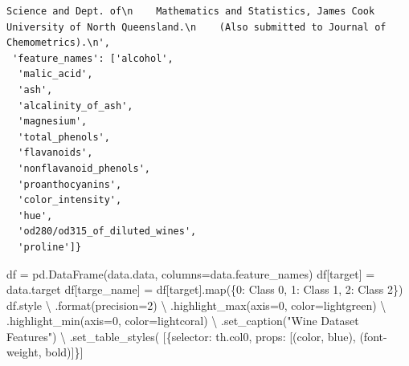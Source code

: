 \documentclass[
  letterpaper,
  DIV=11,
  numbers=noendperiod]{scrreprt}
\newenvironment{Shaded}{\begin{snugshade}}{\end{snugshade}}
\newcommand{\BuiltInTok}[1]{\textcolor[rgb]{0.00,0.23,0.31}{#1}}
\newcommand{\DecValTok}[1]{\textcolor[rgb]{0.68,0.00,0.00}{#1}}
\newcommand{\NormalTok}[1]{\textcolor[rgb]{0.00,0.23,0.31}{#1}}
\newcommand{\OperatorTok}[1]{\textcolor[rgb]{0.37,0.37,0.37}{#1}}
\newcommand{\StringTok}[1]{\textcolor[rgb]{0.13,0.47,0.30}{#1}}
\begin{document}
\begin{verbatim}
Science and Dept. of\n    Mathematics and Statistics, James Cook University of North Queensland.\n    (Also submitted to Journal of Chemometrics).\n',
 'feature_names': ['alcohol',
  'malic_acid',
  'ash',
  'alcalinity_of_ash',
  'magnesium',
  'total_phenols',
  'flavanoids',
  'nonflavanoid_phenols',
  'proanthocyanins',
  'color_intensity',
  'hue',
  'od280/od315_of_diluted_wines',
  'proline']}
\end{verbatim}

\begin{Shaded}
\begin{Highlighting}[]
\NormalTok{df }\OperatorTok{=}\NormalTok{ pd.DataFrame(data.data, columns}\OperatorTok{=}\NormalTok{data.feature\_names)}
\NormalTok{df[}\StringTok{\textquotesingle{}target\textquotesingle{}}\NormalTok{] }\OperatorTok{=}\NormalTok{ data.target}
\NormalTok{df[}\StringTok{\textquotesingle{}targe\_name\textquotesingle{}}\NormalTok{] }\OperatorTok{=}\NormalTok{ df[}\StringTok{\textquotesingle{}target\textquotesingle{}}\NormalTok{].}\BuiltInTok{map}\NormalTok{(\{}\DecValTok{0}\NormalTok{: }\StringTok{\textquotesingle{}Class 0\textquotesingle{}}\NormalTok{, }\DecValTok{1}\NormalTok{: }\StringTok{\textquotesingle{}Class 1\textquotesingle{}}\NormalTok{, }\DecValTok{2}\NormalTok{: }\StringTok{\textquotesingle{}Class 2\textquotesingle{}}\NormalTok{\})}
\NormalTok{df.style }\OperatorTok{\textbackslash{}}
\NormalTok{  .}\BuiltInTok{format}\NormalTok{(precision}\OperatorTok{=}\DecValTok{2}\NormalTok{) }\OperatorTok{\textbackslash{}}
\NormalTok{  .highlight\_max(axis}\OperatorTok{=}\DecValTok{0}\NormalTok{, color}\OperatorTok{=}\StringTok{\textquotesingle{}lightgreen\textquotesingle{}}\NormalTok{) }\OperatorTok{\textbackslash{}}
\NormalTok{  .highlight\_min(axis}\OperatorTok{=}\DecValTok{0}\NormalTok{, color}\OperatorTok{=}\StringTok{\textquotesingle{}lightcoral\textquotesingle{}}\NormalTok{) }\OperatorTok{\textbackslash{}}
\NormalTok{  .set\_caption(}\StringTok{"Wine Dataset Features"}\NormalTok{) }\OperatorTok{\textbackslash{}}
\NormalTok{  .set\_table\_styles(}
\NormalTok{    [\{}\StringTok{\textquotesingle{}selector\textquotesingle{}}\NormalTok{: }\StringTok{\textquotesingle{}th.col0\textquotesingle{}}\NormalTok{, }\StringTok{\textquotesingle{}props\textquotesingle{}}\NormalTok{: [(}\StringTok{\textquotesingle{}color\textquotesingle{}}\NormalTok{, }\StringTok{\textquotesingle{}blue\textquotesingle{}}\NormalTok{), (}\StringTok{\textquotesingle{}font{-}weight\textquotesingle{}}\NormalTok{, }\StringTok{\textquotesingle{}bold\textquotesingle{}}\NormalTok{)]\}]}

\end{Highlighting}
\end{Shaded}
\end{document}

